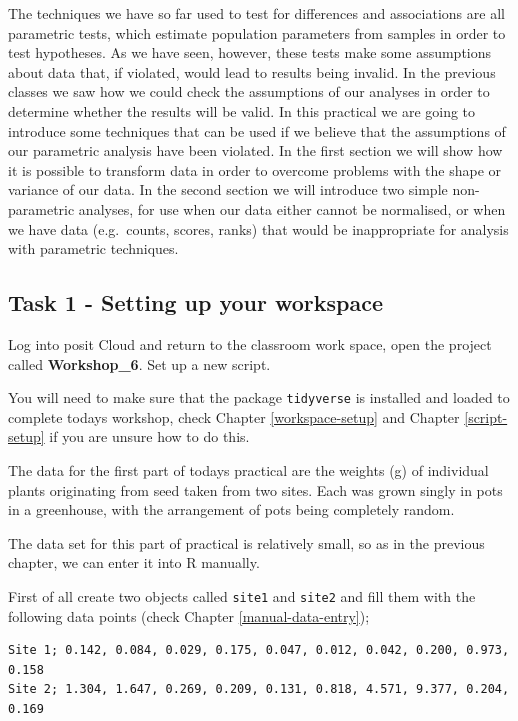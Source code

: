 \documentclass[
]{book}
\begin{document}
The techniques we have so far used to test for differences and associations are all parametric tests, which estimate population parameters from samples in order to test hypotheses. As we have seen, however, these tests make some assumptions about data that, if violated, would lead to results being invalid. In the previous classes we saw how we could check the assumptions of our analyses in order to determine whether the results will be valid. In this practical we are going to introduce some techniques that can be used if we believe that the assumptions of our parametric analysis have been violated. In the first section we will show how it is possible to transform data in order to overcome problems with the shape or variance of our data. In the second section we will introduce two simple non-parametric analyses, for use when our data either cannot be normalised, or when we have data (e.g.~counts, scores, ranks) that would be inappropriate for analysis with parametric techniques.

\subsection{Task 1 - Setting up your workspace}\label{task-1---setting-up-your-workspace-2}

Log into posit Cloud and return to the classroom work space, open the project called \textbf{Workshop\_6}. Set up a new script.

You will need to make sure that the package \texttt{tidyverse} is installed and loaded to complete todays workshop, check Chapter \ref{workspace-setup} and Chapter \ref{script-setup} if you are unsure how to do this.

The data for the first part of todays practical are the weights (g) of individual plants originating from seed taken from two sites. Each was grown singly in pots in a greenhouse, with the arrangement of pots being completely random.

The data set for this part of practical is relatively small, so as in the previous chapter, we can enter it into R manually.

First of all create two objects called \texttt{site1} and \texttt{site2} and fill them with the following data points (check Chapter \ref{manual-data-entry});

\begin{verbatim}
Site 1; 0.142, 0.084, 0.029, 0.175, 0.047, 0.012, 0.042, 0.200, 0.973, 0.158
Site 2; 1.304, 1.647, 0.269, 0.209, 0.131, 0.818, 4.571, 9.377, 0.204, 0.169
\end{verbatim}
\end{document}

